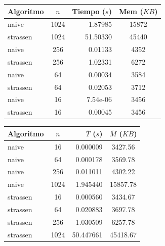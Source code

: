 \begin{itemize}
\begin{table}[H]
    \begin{minipage}[t]{0.48\textwidth}
        \centering
        \small
        \begin{tabular}{|l|c|r|c|}
            \hline
            \textbf{Algoritmo} & \textbf{$n$} & \textbf{Tiempo ($s$)} & \textbf{Mem ($KB$)} \\ \hline
            naive & 1024 & 1.87985 & 15872 \\ \hline
            strassen & 1024 & 51.50330 & 45440 \\ \hline
            naive & 256 & 0.01133 & 4352 \\ \hline
            strassen & 256 & 1.02331 & 6272 \\ \hline
            naive & 64 & 0.00034 & 3584 \\ \hline
            strassen & 64 & 0.02053 & 3712 \\ \hline
            naive & 16 & 7.54e-06 & 3456 \\ \hline
            strassen & 16 & 0.00045 & 3456 \\ \hline
        \end{tabular}
    \end{minipage}
    \hfill 
    \begin{minipage}[t]{0.48\textwidth}
        \centering
        \small
        \begin{tabular}{|l|c|r|c|}
            \hline
            \textbf{Algoritmo} & \textbf{$n$} & \textbf{$\bar{T}$ ($s$)} & \textbf{$\bar{M}$ ($KB$)} \\ \hline
            naive & 16 & 0.000009 & 3427.56 \\ \hline
            naive & 64 & 0.000178 & 3569.78 \\ \hline
            naive & 256 & 0.011011 & 4302.22 \\ \hline
            naive & 1024 & 1.945440 & 15857.78 \\ \hline
            strassen & 16 & 0.000560 & 3434.67 \\ \hline
            strassen & 64 & 0.020883 & 3697.78 \\ \hline
            strassen & 256 & 1.030509 & 6257.78 \\ \hline
            strassen & 1024 & 50.447661 & 45418.67 \\ \hline
        \end{tabular}
    \end{minipage}
    \end{table}


\end{itemize}
